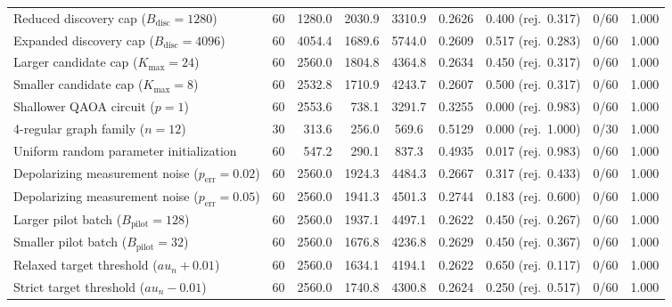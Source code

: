 \begin{table}[htbp]
\begin{tabular}{@{}l c r r c c c c c@{}}
Reduced discovery cap ($B_{\mathrm{disc}}=1280$) & 60 & 1280.0 & 2030.9 & 3310.9 & 0.2626 & 0.400 (rej.\ 0.317) & 0/60 & 1.000 \\
Expanded discovery cap ($B_{\mathrm{disc}}=4096$) & 60 & 4054.4 & 1689.6 & 5744.0 & 0.2609 & 0.517 (rej.\ 0.283) & 0/60 & 1.000 \\
Larger candidate cap ($K_{\max}=24$) & 60 & 2560.0 & 1804.8 & 4364.8 & 0.2634 & 0.450 (rej.\ 0.317) & 0/60 & 1.000 \\
Smaller candidate cap ($K_{\max}=8$) & 60 & 2532.8 & 1710.9 & 4243.7 & 0.2607 & 0.500 (rej.\ 0.317) & 0/60 & 1.000 \\
Shallower QAOA circuit ($p=1$) & 60 & 2553.6 & 738.1 & 3291.7 & 0.3255 & 0.000 (rej.\ 0.983) & 0/60 & 1.000 \\
4-regular graph family ($n=12$) & 30 & 313.6 & 256.0 & 569.6 & 0.5129 & 0.000 (rej.\ 1.000) & 0/30 & 1.000 \\
Uniform random parameter initialization & 60 & 547.2 & 290.1 & 837.3 & 0.4935 & 0.017 (rej.\ 0.983) & 0/60 & 1.000 \\
Depolarizing measurement noise ($p_{\mathrm{err}}=0.02$) & 60 & 2560.0 & 1924.3 & 4484.3 & 0.2667 & 0.317 (rej.\ 0.433) & 0/60 & 1.000 \\
Depolarizing measurement noise ($p_{\mathrm{err}}=0.05$) & 60 & 2560.0 & 1941.3 & 4501.3 & 0.2744 & 0.183 (rej.\ 0.600) & 0/60 & 1.000 \\
Larger pilot batch ($B_{\mathrm{pilot}}=128$) & 60 & 2560.0 & 1937.1 & 4497.1 & 0.2622 & 0.450 (rej.\ 0.267) & 0/60 & 1.000 \\
Smaller pilot batch ($B_{\mathrm{pilot}}=32$) & 60 & 2560.0 & 1676.8 & 4236.8 & 0.2629 & 0.450 (rej.\ 0.367) & 0/60 & 1.000 \\
Relaxed target threshold ($	au_n + 0.01$) & 60 & 2560.0 & 1634.1 & 4194.1 & 0.2622 & 0.650 (rej.\ 0.117) & 0/60 & 1.000 \\
Strict target threshold ($	au_n - 0.01$) & 60 & 2560.0 & 1740.8 & 4300.8 & 0.2624 & 0.250 (rej.\ 0.517) & 0/60 & 1.000 \\
\bottomrule
\end{tabular}
\end{table}
